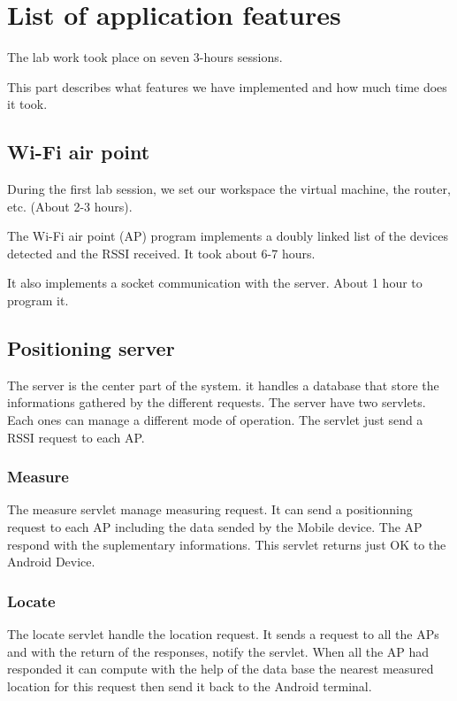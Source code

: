 \section{List of application features}

The lab work took place on seven 3-hours sessions.

This part describes what features we have implemented and how much time does it
took.

\subsection{Wi-Fi air point}

During the first lab session, we set our workspace the virtual machine, 
the router, etc. (About 2-3 hours).

The Wi-Fi air point (AP) program implements a doubly linked list of the devices
detected and the RSSI received. It took about 6-7 hours.

It also implements a socket communication with the server. About 1 hour to
program it.

\subsection{Positioning server}
The server is the center part of the system. it handles a database that store the informations gathered by the different requests.
The server have two servlets. Each ones can manage a different mode of operation.
The servlet just send a RSSI request to each AP.
\subsubsection{Measure}
    The measure servlet manage measuring request. It can send a positionning request to each AP including the data sended by the Mobile device. The AP respond with the suplementary informations. This servlet returns just OK to the Android Device.
\subsubsection{Locate}
     The locate servlet handle the location request. It sends a request to all the APs and with the return of the responses, notify the servlet. When all the AP had responded it can compute with the help of the data base the nearest measured location for this request then send it back to the Android terminal. 

